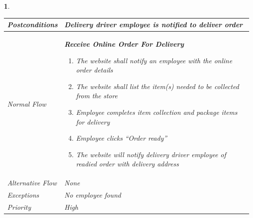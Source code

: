 \documentclass{scrreprt}
\theoremstyle{funreq}
\newtheorem{funreq}{}
\begin{document}
\begin{funreq}
\begin{table}[H]
{\begin{tabularx}{\columnwidth}{|l|X|}
					\\ \hline Postconditions   & 
					Delivery driver employee is notified to deliver order 
					\\ \hline Normal Flow &
					\bfseries{Receive Online Order For Delivery}\normalfont\newline 
					\begin{enumerate}
					    \item The website shall notify an employee with the online order details
					    \item The website shall list the item(s) needed to be collected from the store
                        \item Employee completes item collection and package items for delivery
                        \item Employee clicks “Order ready”
                        \item The website will notify delivery driver employee of readied order with delivery address
					\end{enumerate}
					\\ \hline Alternative Flow & 
					None
					\\ \hline Exceptions & 
					No employee found
					\\ \hline Priority & 
					High
					\\ \hline
				\end{tabularx}%
			}
		\end{table}
	\end{funreq}
\end{document}
